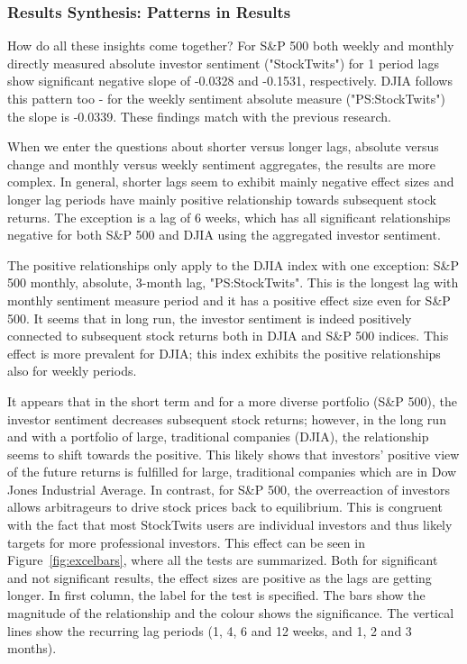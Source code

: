 \subsubsection{Results Synthesis: Patterns in Results}
How do all these insights come together? For S\&P 500 both weekly and monthly directly measured absolute investor sentiment ("StockTwits") for 1 period lags show significant negative slope of -0.0328 and -0.1531, respectively. DJIA follows this pattern too - for the weekly sentiment absolute measure ("PS:StockTwits") the slope is -0.0339. These findings match with the previous research. 
\par
When we enter the questions about shorter versus longer lags, absolute versus change and monthly versus weekly sentiment aggregates, the results are more complex. In general, shorter lags seem to exhibit mainly negative effect sizes and longer lag periods have mainly positive relationship towards subsequent stock returns. The exception is a lag of 6 weeks, which has all significant relationships negative for both S\&P 500 and DJIA using the aggregated investor sentiment.
\par
The positive relationships only apply to the DJIA index with one exception: S\&P 500 monthly, absolute, 3-month lag, "PS:StockTwits". This is the longest lag with monthly sentiment measure period and it has a positive effect size even for S\&P 500. It seems that in long run, the investor sentiment is indeed positively connected to subsequent stock returns both in DJIA and S\&P 500 indices. This effect is more prevalent for DJIA; this index exhibits the positive relationships also for weekly periods.
\par
It appears that in the short term and for a more diverse portfolio (S\&P 500), the investor sentiment decreases subsequent stock returns; however, in the long run and with a portfolio of large, traditional companies (DJIA), the relationship seems to shift towards the positive. This likely shows that investors' positive view of the future returns is fulfilled for large, traditional companies which are in Dow Jones Industrial Average. In contrast, for S\&P 500, the overreaction of investors allows arbitrageurs to drive stock prices back to equilibrium. This is congruent with the fact that most StockTwits users are individual investors and thus likely targets for more professional investors. This effect can be seen in Figure~\ref{fig:excelbars}, where all the tests are summarized. Both for significant and not significant results, the effect sizes are positive as the lags are getting longer. In first column, the label for the test is specified. The bars show the magnitude of the relationship and the colour shows the significance. The vertical lines show the recurring lag periods (1, 4, 6 and 12 weeks, and 1, 2 and 3 months). 

